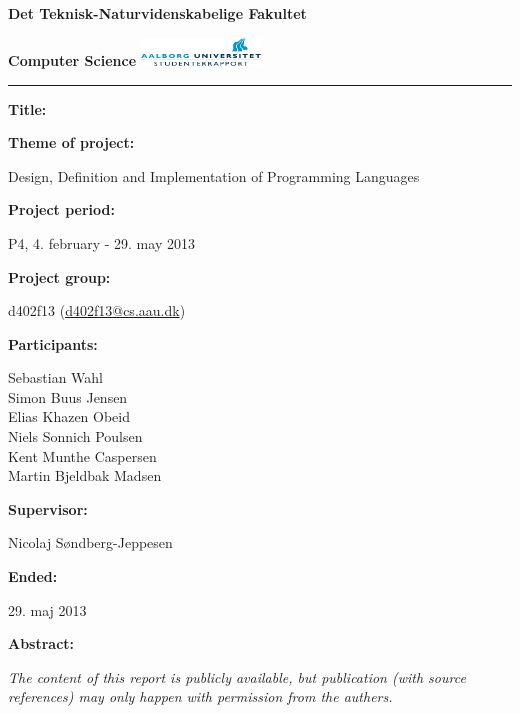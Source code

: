\begin{nopagebreak}
\LARGE{\textbf{Det Teknisk-Naturvidenskabelige Fakultet}}\vspace{-0.9cm}

\large{\textbf{Computer Science}}
\hspace{10.5cm}\includegraphics[height=0.75cm]{pictures/aau_logo.pdf}


\hrule

\newcommand{\titleitem}[2]{\textbf{#1:}

\hspace*{0.5cm}
\begin{minipage}{0.9\columnwidth}#2\end{minipage}
\vspace{0.25cm}}
\begin{multicols}{2}

\titleitem{Title}{}

\titleitem{Theme of project}{Design, Definition and Implementation of Programming Languages}

\titleitem{Project period}{P4, 4. february - 29. may 2013}

\titleitem{Project group}{d402f13 (\url{d402f13@cs.aau.dk})}

\titleitem{Participants}{
    Sebastian Wahl\\
    Simon Buus Jensen\\
    Elias Khazen Obeid\\
    Niels Sonnich Poulsen\\
    Kent Munthe Caspersen\\
    Martin Bjeldbak Madsen
}

\titleitem{Supervisor}{Nicolaj Søndberg-Jeppesen}

\titleitem{Ended}{29. maj 2013}

\vfill
\columnbreak

\titleitem{Abstract}{}

\end{multicols}
\centering
\textit{The content of this report is publicly available, but publication (with source references) may only happen with permission from the authers.}

\end{nopagebreak}
